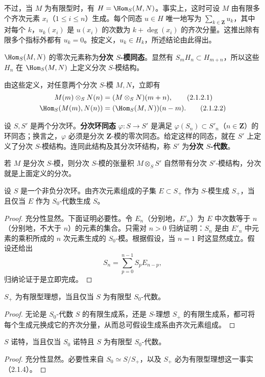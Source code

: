 不过，当 $M$ 为有限型时，有 $H=\Hom_S(M,N)$。事实上，这时可设 $M$ 由有限多个齐次元素 $x_i$（$1\leq i\leq n$）生成。每个同态 $u\in H$ 唯一地写为 $\sum_{k\in\mathbf Z}u_k$，其中对每个 $k$，$u_k(x_i)$ 是 $u(x_i)$ 的次数为 $k+\deg(x_i)$ 的齐次分量。这推出除有限多个指标外都有 $u_k=0$。按定义，$u_k\in H_k$，所述结论由此得出。

$\Hom_S(M,N)$ 的零次元素称为\textbf{分次 $S$-模同态}。显然有 $S_mH_n\subset H_{m+n}$，所以这些 $H_n$ 在 $\Hom_S(M,N)$ 上定义分次 $S$-模结构。

由这些定义，对任意两个分次 $S$-模 $M,N$，立即有
\begin{align}
M(m)\otimes_SN(n)&=(M\otimes_SN)(m+n),\tag{2.1.2.1}\\
\Hom_S(M(m),N(n))&=(\Hom_S(M,N))(n-m).\tag{2.1.2.2}
\end{align}

设 $S,S'$ 是两个分次环。\textbf{分次环同态} $\varphi:S\to S'$ 是满足
$\varphi(S_n)\subset S'_n$（$n\in\mathbf Z$）的环同态；换言之，$\varphi$ 必须是分次 $\mathbf Z$-模的零次同态。给定这样的同态，就在 $S'$ 上定义了分次 $S$-模结构。连同此结构及其分次环结构，称 $S'$ 为\textbf{分次 $S$-代数}。

若 $M$ 是分次 $S$-模，则分次 $S$-模的张量积 $M\otimes_SS'$ 自然带有分次 $S'$-模结构，分次就是上面定义的分次。

设 $S$ 是一个非负分次环。由齐次元素组成的子集 $E\subset S_+$ 作为 $S$-模生成 $S_+$，当且仅当 $E$ 作为 $S_0$-代数生成 $S$。
\begin{proof}
充分性显然。下面证明必要性。令 $E_n$（分别地，$E'_n$）为 $E$ 中次数等于 $n$（分别地，不大于 $n$）的元素的集合。只需对 $n>0$ 归纳证明：$S_n$ 是由 $E'_n$ 中元素的乘积所成的 $n$ 次元素生成的 $S_0$-模。根据假设，当 $n=1$ 时这显然成立。假设还给出
\[
S_n=\sum_{p=0}^{n-1}S_pE_{n-p},
\]
归纳论证于是立即完成。
\end{proof}

$S_+$ 为有限型理想，当且仅当 $S$ 为有限型 $S_0$-代数。
\begin{proof}
无论是 $S_0$-代数 $S$ 的有限生成系，还是 $S$-理想 $S_+$ 的有限生成系，都可将每个生成元换成它的齐次分量，从而总可假设生成系由齐次元素组成。
\end{proof}

$S$ 诺特，当且仅当 $S_0$ 诺特且 $S$ 为有限型 $S_0$-代数。
\begin{proof}
充分性显然。必要性来自 $S_0\simeq S/S_+$，以及 $S_+$ 必为有限型理想这一事实（2.1.4）。
\end{proof}

